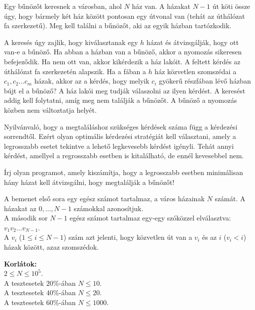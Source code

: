 





Egy bűnözőt keresnek a városban, ahol $N$ ház van. A házakat $N-1$ út köti össze úgy, hogy bármely két ház között pontosan egy útvonal van (tehát az úthálózat fa szerkezetű).
Meg kell találni a bűnözőt, aki az egyik házban tartózkodik.


A keresés úgy zajlik, hogy kiválasztanak egy $h$ házat és átvizsgálják, hogy ott van-e a bűnöző. Ha abban a házban van a bűnöző, akkor a nyomozás sikeresen befejeződik. Ha nem ott van, akkor kikérdezik a ház lakóit. A feltett kérdés az úthálózat fa szerkezetén alapszik. Ha a fában a $h$ ház közvetlen szomszédai a $c_1, c_2 \ldots c_m$ házak, akkor az a kérdés, hogy melyik $c_i$ gyökerű részfában lévő házban bújt el a bűnöző? A ház lakói meg tudják válaszolni az ilyen kérdést.
A keresést addig kell folytatni, amíg meg nem találják a bűnözőt. A bűnöző a nyomozás közben nem változtatja helyét.

Nyilvánvaló, hogy a megtaláláshoz szükséges kérdések száma függ a kérdezési sorrendtől.
Ezért olyan optimális kérdezési stratégiát kell választani, amely a legrosszabb esetet tekintve a lehető legkevesebb kérdést igényli. 
Tehát annyi kérdést, amellyel a regrosszabb esetben is kitalálható, de ennél kevesebbel nem.

Írj olyan programot, amely kiszámítja, hogy a legrosszabb esetben minimálisan hány házat kell átvizsgálni, hogy megtalálják a bűnözőt! 


A bemenet első sora egy egész számot tartalmaz, a város házainak $N$ számát. A házakat az $0, \ldots,N-1$ számokkal azonosítjuk.\\
A második sor $N-1$ egész számot tartalmaz egy-egy szóközzel elválasztva: $v_1 v_2 \ldots v_{N-1}$.\\
A $v_i$ ($1 \leq i \leq N-1$) szám azt jelenti, hogy közvetlen út van a $v_i$ és az $i$ ($v_i < i$) házak között, azaz szomszédok.

\smallskip
\noindent \textbf{Korlátok:}\\
$2 \leq N \leq 10^5$.\\
A tesztesetek $20\%$-ában  $N \leq 10$.\\
A tesztesetek $40\%$-ában   $N \leq 20$.\\
A tesztesetek $60\%$-ában   $N \leq 1000$.

